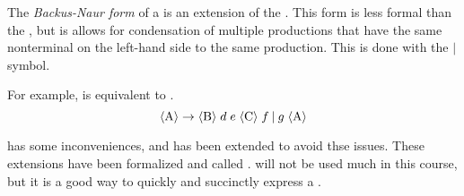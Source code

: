 \begin{definition}\label{def:CFG_BNF_Form}
  The \emph{Backus-Naur form} of a  is an extension of the .
  This form is less formal than the , but is allows for condensation of multiple productions that have the same nonterminal on the left-hand side to the same production.
  This is done with the $\vert$ symbol.

  For example,  is equivalent to .
  \begin{equation}\label{eq:CFG_BNF_Form}
    \langle \text{A} \rangle \rightarrow \langle \text{B} \rangle \; d \; e \; \langle \text{C} \rangle \; f \: \vert \: g\; \langle \text{A} \rangle
  \end{equation}
\end{definition}

 has some inconveniences, and has been extended to avoid thse issues.
These extensions have been formalized and called .
 will not be used much in this course, but it is a good way to quickly and succinctly express a .


